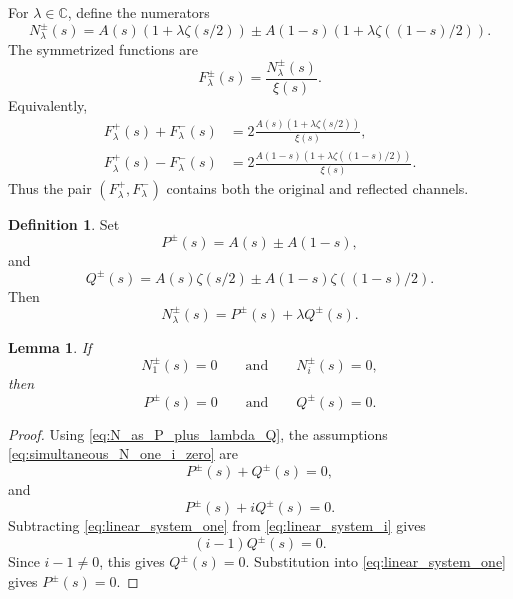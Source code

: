 \documentclass[11pt]{amsart}
\numberwithin{equation}{section}
\theoremstyle{plain}
\newtheorem{lemma}[theorem]{Lemma}
\theoremstyle{definition}
\newtheorem{definition}[theorem]{Definition}
\theoremstyle{remark}
\begin{document}
For \(\lambda\in\mathbb C\), define the numerators
\begin{equation}
N_\lambda^{\pm}(s)=A(s)(1+\lambda\zeta(s/2))
\pm A(1-s)(1+\lambda\zeta((1-s)/2)).
\label{eq:N_lambda_pm_definition}
\end{equation}
The symmetrized functions are
\begin{equation}
F_\lambda^{\pm}(s)=\frac{N_\lambda^{\pm}(s)}{\xi(s)}.
\label{eq:F_lambda_pm_definition}
\end{equation}
Equivalently,
\begin{align}
F_\lambda^{+}(s)+F_\lambda^{-}(s)
&=2\frac{A(s)(1+\lambda\zeta(s/2))}{\xi(s)},
\label{eq:F_sum_recovers_nonreflected}\\
F_\lambda^{+}(s)-F_\lambda^{-}(s)
&=2\frac{A(1-s)(1+\lambda\zeta((1-s)/2))}{\xi(s)}.
\label{eq:F_difference_recovers_reflected}
\end{align}
Thus the pair \((F_\lambda^+,F_\lambda^-)\) contains both the original and reflected channels.

\begin{definition}
\label{def:PQ_pm}
Set
\begin{equation}
P^{\pm}(s)=A(s)\pm A(1-s),
\label{eq:P_pm_definition}
\end{equation}
and
\begin{equation}
Q^{\pm}(s)=A(s)\zeta(s/2)\pm A(1-s)\zeta((1-s)/2).
\label{eq:Q_pm_definition}
\end{equation}
Then
\begin{equation}
N_\lambda^{\pm}(s)=P^{\pm}(s)+\lambda Q^{\pm}(s).
\label{eq:N_as_P_plus_lambda_Q}
\end{equation}
\end{definition}

\begin{lemma}
\label{lem:lambda_one_i_detection}
If
\begin{equation}
N_1^{\pm}(s)=0
\qquad\text{and}\qquad
N_i^{\pm}(s)=0,
\label{eq:simultaneous_N_one_i_zero}
\end{equation}
then
\begin{equation}
P^{\pm}(s)=0
\qquad\text{and}\qquad
Q^{\pm}(s)=0.
\label{eq:simultaneous_PQ_zero}
\end{equation}
\end{lemma}

\begin{proof}
Using \eqref{eq:N_as_P_plus_lambda_Q}, the assumptions \eqref{eq:simultaneous_N_one_i_zero} are
\begin{equation}
P^{\pm}(s)+Q^{\pm}(s)=0,
\label{eq:linear_system_one}
\end{equation}
and
\begin{equation}
P^{\pm}(s)+iQ^{\pm}(s)=0.
\label{eq:linear_system_i}
\end{equation}
Subtracting \eqref{eq:linear_system_one} from \eqref{eq:linear_system_i} gives
\begin{equation}
(i-1)Q^{\pm}(s)=0.
\label{eq:Q_zero_from_two_lambdas}
\end{equation}
Since \(i-1\neq 0\), this gives \(Q^{\pm}(s)=0\).  Substitution into \eqref{eq:linear_system_one} gives \(P^{\pm}(s)=0\).
\end{proof}
\end{document}
